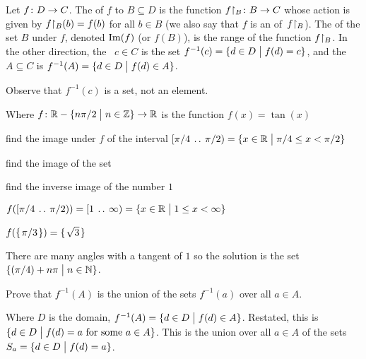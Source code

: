 \documentclass{ibl}  %
\begin{document}
\begin{df}
Let $\mbox{$f\colon D\to C$}$.
The  of $f$ to $B\subseteq D$ is
the function $\mbox{${f}\mathord\upharpoonright_{B}\colon B\to C$}$ whose action is given by 
${f}\mathord\upharpoonright_{B}(b)=f(b)$ for all $b\in B$
(we also say that
$f$ is an  of~${f}\mathord\upharpoonright_{B}$).
The  of the set $B$ under $f$, 
denoted $\operatorname{Im}(f)$ (or $f(B)$),
is the range of the function ${f}\mathord\upharpoonright_{B}$.
In the other direction, 
the ~$c\in C$ is
the set $f^{-1}(c)=\{d\in D \bigm| f(d)=c\}$, and 
the ~$A\subseteq C$
is $f^{-1}(A)=\{d\in D \bigm| f(d)\in A\}$.   
\end{df}

Observe that $f^{-1}(c)$ is a set,
not an element.

\begin{problem}
\begin{items}
Where $\mbox{$f\colon \mathbb{R}-\{n\pi/2 \bigm| n\in\mathbb{Z}\}\to \mathbb{R}$}$ 
is the function $f(x)=\tan(x)$
\item find the image under $f$ of the interval
$[\pi/4\:\mathinner{\ldotp\ldotp}\:\pi/2)=\{x\in\mathbb{R} \bigm| \pi/4\leq x<\pi/2\}$
\item find the image of the set 
\item find the inverse image of the number $1$
\end{items}
\begin{answer}
\begin{items}
\item $f([\pi/4\:\mathinner{\ldotp\ldotp}\:\pi/2))=[1\:\mathinner{\ldotp\ldotp}\:\infty)
             =\{x\in\mathbb{R} \bigm| 1\leq x<\infty\}$ 
\item $f(\mbox{$\{\hspace{0.1em}\pi/3\hspace{0.1em}\}$})=\mbox{$\{\hspace{0.1em}\sqrt{3}\hspace{0.1em}\}$}$
\item There are many angles with a tangent of $1$ so the
  solution is the set $\{(\pi/4)+n\pi \bigm| n\in \mathbb{N}\}$.
\end{items}
\end{answer}
\end{problem}


\begin{problem}
Prove that $f^{-1}(A)$ is the union of the sets $f^{-1}(a)$ over all $a\in A$.
\begin{answer}
Where $D$ is the domain, 
$f^{-1}(A)=\{d\in D \bigm| f(d)\in A\}$.
Restated, this is $\{d\in D \bigm| \text{$f(d)=a$ for some $a\in A$}\}$.
This is the union over all $a\in A$ of the 
sets $S_a=\{d\in D \bigm| f(d)=a\}$.  
\end{answer}
\end{problem}
\end{document}
